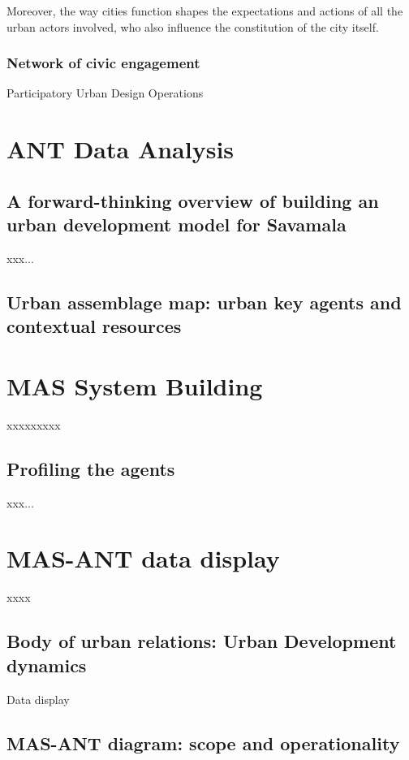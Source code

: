 \documentclass[11pt]{report}
\begin{document}
Moreover, the way cities function shapes the expectations and actions of all the urban actors involved, who also influence the constitution of the city itself. 

\subsection{Network of civic engagement}

Participatory Urban Design Operations



\chapter{ANT Data Analysis}

\section{A forward-thinking overview of building an urban development model for Savamala}

xxx...

\section{Urban assemblage map: urban key agents and contextual resources}

\chapter{MAS System Building}

xxxxxxxxx

\section{Profiling the agents}

xxx...

\chapter{MAS-ANT data display}
xxxx

\section{Body of urban relations: Urban Development dynamics}
Data display
\section{MAS-ANT diagram: scope and operationality}
\end{document}
